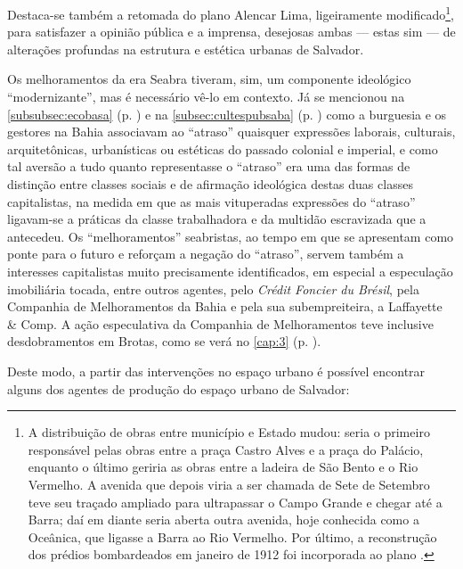 Destaca-se também a retomada do plano Alencar Lima, ligeiramente modificado\footnote{A distribuição de obras entre município e Estado mudou: seria o primeiro responsável pelas obras entre a praça Castro Alves e a praça do Palácio, enquanto o último geriria as obras entre a ladeira de São Bento e o Rio Vermelho. A avenida que depois viria a ser chamada de Sete de Setembro teve seu traçado ampliado para ultrapassar o Campo Grande e chegar até a Barra; daí em diante seria aberta outra avenida, hoje conhecida como a Oceânica, que ligasse a Barra ao Rio Vermelho. Por último, a reconstrução dos prédios bombardeados em janeiro de 1912 foi incorporada ao plano \cite[p.~101]{CUNHA2011}.}, para satisfazer a opinião pública e a imprensa, desejosas ambas --- estas sim --- de alterações profundas na estrutura e estética urbanas de Salvador.

Os melhoramentos da era Seabra tiveram, sim, um componente ideológico ``modernizante'', mas é necessário vê-lo em contexto. Já se mencionou na \autoref{subsubsec:ecobasa} (p. \pageref{subsubsec:ecobasa}) e na \autoref{subsec:cultespubsaba} (p. \pageref{subsec:cultespubsaba}) como a burguesia e os gestores na Bahia associavam ao ``atraso'' quaisquer expressões laborais, culturais, arquitetônicas, urbanísticas ou estéticas do passado colonial e imperial, e como tal aversão a tudo quanto representasse o ``atraso'' era uma das formas de distinção entre classes sociais e de afirmação ideológica destas duas classes capitalistas, na medida em que as mais vituperadas expressões do ``atraso'' ligavam-se a práticas da classe trabalhadora e da multidão escravizada que a antecedeu. Os ``melhoramentos'' seabristas, ao tempo em que se apresentam como ponte para o futuro e reforçam a negação do ``atraso'', servem também a interesses capitalistas muito precisamente identificados, em especial a especulação imobiliária tocada, entre outros agentes, pelo \textit{Crédit Foncier du Brésil}, pela Companhia de Melhoramentos da Bahia e pela sua subempreiteira, a Laffayette \& Comp. A ação especulativa da Companhia de Melhoramentos teve inclusive desdobramentos em Brotas, como se verá no \autoref{cap:3} (p. \pageref{cap:3}).

Deste modo, a partir das intervenções no espaço urbano é possível encontrar alguns dos agentes de produção do espaço urbano de Salvador:

